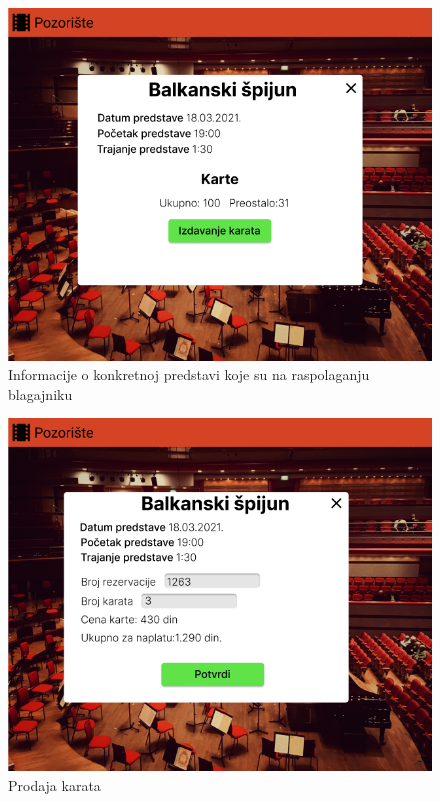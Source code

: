\documentclass[a4paper]{article}
\begin{document}
\begin{figure}[H]
  \begin{center}
    \includegraphics[width=130mm]{../images/blagajnik_prodaja_karata.png}
  \end{center}
  \caption{Informacije o konkretnoj predstavi koje su na raspolaganju blagajniku}
  \label{blagajnik_prodaja_karata}
\end{figure}

\begin{figure}[H]
  \begin{center}
    \includegraphics[width=130mm]{../images/blagajnik_prodaja_karata2.png}
  \end{center}
  \caption{Prodaja karata}
  \label{blagajnik_prodaja_karata2}
\end{figure}
\end{document}
